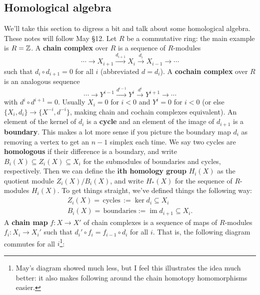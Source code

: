 \subsection{Homological algebra}
We'll take this section to digress a bit and talk about some homological algebra. These notes will follow May \S 12.
\orbreak
Let $R$ be a commutative ring: the main example is $R=\mathbb{Z}$. A \textbf{chain complex} over $R$ is a sequence of $R$-modules \[
    \cdots \to X_{i+1}\overset{d_{i+1}}{\longrightarrow}X_i \overset{d_i }{\longrightarrow}X_{i-1}\to \cdots 
\] such that $d_i \circ d_{i+1}=0$ for all $i$ (abbreviated $d=d_i $). A \textbf{cochain complex} over $R$ is an analogous sequence \[
\cdots \to Y^{i-1}\overset{d^{i-1}}{\longrightarrow}Y^i \overset{d^i }{\longrightarrow}Y^{i+1}\to \cdots 
\] with $d^i \circ d^{i+1}=0$. Usually $X_i =0$ for $i<0$ and $Y^i =0$ for $i<0$ (or else $\{X_i ,d_i \} \to \{X^{-i},d^{-i}\} $, making chain and cochain complexes equivalent). An element of the kernel of $d_i $ is a \textbf{cycle} and an element of the image of $d_{i+1}$ is a \textbf{boundary}. This makes a lot more sense if you picture the boundary map $d_i $ as removing a vertex to get an $n-1$ simplex each time. We say two cycles are \textbf{homologous} if their difference is a boundary, and write $B_i (X) \subseteq Z_i  (X) \subseteq X_i $ for the submodules of boundaries and cycles, respectively. Then we can define the $\mathbf{i}$\textbf{th homology group} $H_i (X)$ as the quotient module $Z_i (X) /B_i (X)$, and write $H_*(X)$ for the sequence of $R $-modules $H_i (X)$.
To get things straight, we've defined things the following way:
\begin{gather*}
    Z_i (X)= \, \text{cycles} \, := \ker d_i \subseteq X_i  \\
    B_i (X)= \, \text{boundaries} := \operatorname{im}d_{i+1} \subseteq X_i .
\end{gather*}
\orbreak
A \textbf{chain map} $f \colon X \to X'$ of chain complexes is a sequence of maps of $R$-modules $f_i \colon X_i  \to X_i '$ such that $d_i '\circ f_i =f_{i-1}\circ d_i $ for all $i$. That is, the following diagram commutes for all $i$\footnote{May's diagram showed much less, but I feel this illustrates the idea much better: it also makes following around the chain homotopy homomorphisms easier.}:
\begin{figure}[H]
\centering
{}
\end{figure}
